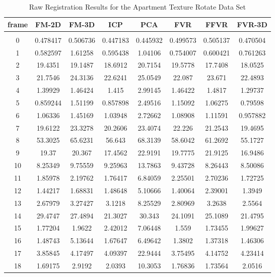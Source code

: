 \begin{center}
\begin{longtable}{cccccccc}
\caption{Raw Registration Results for the Apartment Texture Rotate Data Set}
\label{tab:apartmenttexturerotateFULL}
\endfirsthead
\endhead
\textbf{frame} & \textbf{FM-2D} & \textbf{FM-3D} & \textbf{ICP} & \textbf{PCA} & \textbf{FVR} & \textbf{FFVR} & \textbf{FVR-3D} \\
\hline \\
0 & 0.478417 & 0.506736 & 0.447183 & 0.445932 & 0.499573 & 0.505137 & 0.470504\\
1 & 0.582597 & 1.61258 & 0.595438 & 1.04106 & 0.754007 & 0.600421 & 0.761263\\
2 & 19.4351 & 19.1487 & 18.6912 & 20.7154 & 19.5778 & 17.7408 & 18.0525\\
3 & 21.7546 & 24.3136 & 22.6241 & 25.0549 & 22.087 & 23.671 & 22.4893\\
4 & 1.39929 & 1.46424 & 1.415 & 2.99145 & 1.46422 & 1.4817 & 1.29737\\
5 & 0.859244 & 1.51199 & 0.857898 & 2.49516 & 1.15092 & 1.06275 & 0.79598\\
6 & 1.06336 & 1.45169 & 1.03948 & 2.72662 & 1.08908 & 1.11591 & 0.957882\\
7 & 19.6122 & 23.3278 & 20.2606 & 23.4074 & 22.226 & 21.2543 & 19.4695\\
8 & 53.3025 & 65.6231 & 56.643 & 68.3139 & 58.6042 & 61.2692 & 55.1727\\
9 & 19.37 & 20.367 & 17.4562 & 22.9191 & 19.7775 & 21.9125 & 16.9486\\
10 & 8.25349 & 9.75559 & 9.25963 & 13.7863 & 9.43728 & 8.26443 & 8.50086\\
11 & 1.85978 & 2.19762 & 1.76417 & 6.84059 & 2.25501 & 2.70236 & 1.72725\\
12 & 1.44217 & 1.68831 & 1.48648 & 5.10666 & 1.40064 & 2.39001 & 1.3949\\
13 & 2.67979 & 3.27427 & 3.1218 & 8.25529 & 2.80969 & 3.2638 & 2.5564\\
14 & 29.4747 & 27.4894 & 21.3027 & 30.343 & 24.1091 & 25.1089 & 21.4795\\
15 & 1.77204 & 1.9622 & 2.42012 & 7.06448 & 1.559 & 1.73455 & 1.99627\\
16 & 1.48743 & 5.13644 & 1.67647 & 6.49642 & 1.3802 & 1.37318 & 1.46306\\
17 & 3.85845 & 4.17497 & 4.09397 & 22.9444 & 3.75495 & 4.14752 & 4.23414\\
18 & 1.69175 & 2.9192 & 2.0393 & 10.3053 & 1.76836 & 1.73564 & 2.0516\\

\end{longtable}
\end{center}
